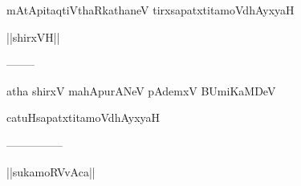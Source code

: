 \documentclass{article}
\begin{document}
\begin{center}
mAtApitaqtiVthaRkathaneV tirxsapatxtitamoVdhAyxyaH
\end{center}

\begin{center}
||shirxVH||
\end{center}

\begin{center}
--------
\end{center}

\begin{center}
atha shirxV mahApurANeV pAdemxV BUmiKaMDeV
\end{center}

\begin{center}
catuHsapatxtitamoVdhAyxyaH
\end{center}

\begin{center}

---------------
\end{center}

\begin{center}
||sukamoRVvAca||
\end{center}
\end{document}
